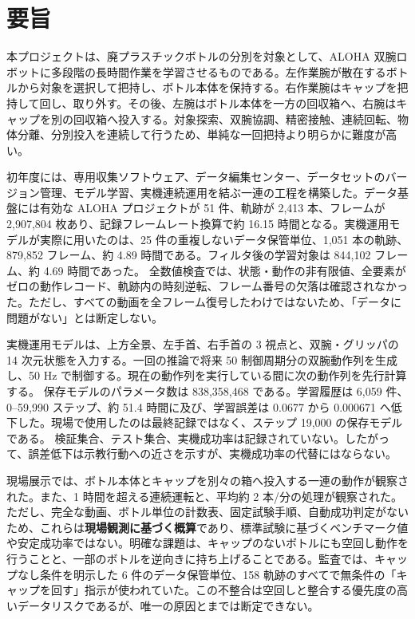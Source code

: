 \chapter*{要旨}

本プロジェクトは、廃プラスチックボトルの分別を対象として、ALOHA 双腕ロボットに多段階の長時間作業を学習させるものである。左作業腕が散在するボトルから対象を選択して把持し、ボトル本体を保持する。右作業腕はキャップを把持して回し、取り外す。その後、左腕はボトル本体を一方の回収箱へ、右腕はキャップを別の回収箱へ投入する。対象探索、双腕協調、精密接触、連続回転、物体分離、分別投入を連続して行うため、単純な一回把持より明らかに難度が高い。

初年度には、専用収集ソフトウェア、データ編集センター、データセットのバージョン管理、モデル学習、実機連続運用を結ぶ一連の工程を構築した。データ基盤には有効な ALOHA プロジェクトが 51 件、軌跡が 2,413 本、フレームが 2,907,804 枚あり、記録フレームレート換算で約 16.15 時間となる。実機運用モデルが実際に用いたのは、25 件の重複しないデータ保管単位、1,051 本の軌跡、879,852 フレーム、約 4.89 時間である。フィルタ後の学習対象は 844,102 フレーム、約 4.69 時間であった。 全数値検査では、状態・動作の非有限値、全要素がゼロの動作レコード、軌跡内の時刻逆転、フレーム番号の欠落は確認されなかった。ただし、すべての動画を全フレーム復号したわけではないため、「データに問題がない」とは断定しない。

実機運用モデルは、上方全景、左手首、右手首の 3 視点と、双腕・グリッパの 14 次元状態を入力する。一回の推論で将来 50 制御周期分の双腕動作列を生成し、50 Hz で制御する。現在の動作列を実行している間に次の動作列を先行計算する。 保存モデルのパラメータ数は 838,358,468 である。学習履歴は 6,059 件、0--59,990 ステップ、約 51.4 時間に及び、学習誤差は 0.0677 から 0.000671 へ低下した。現場で使用したのは最終記録ではなく、ステップ 19,000 の保存モデルである。 検証集合、テスト集合、実機成功率は記録されていない。したがって、誤差低下は示教行動への近さを示すが、実機成功率の代替にはならない。

現場展示では、ボトル本体とキャップを別々の箱へ投入する一連の動作が観察された。また、1 時間を超える連続運転と、平均約 2 本/分の処理が観察された。 ただし、完全な動画、ボトル単位の計数表、固定試験手順、自動成功判定がないため、これらは\textbf{現場観測に基づく概算}であり、標準試験に基づくベンチマーク値や安定成功率ではない。明確な課題は、キャップのないボトルにも空回し動作を行うことと、一部のボトルを逆向きに持ち上げることである。監査では、キャップなし条件を明示した 6 件のデータ保管単位、158 軌跡のすべてで無条件の「キャップを回す」指示が使われていた。この不整合は空回しと整合する優先度の高いデータリスクであるが、唯一の原因とまでは断定できない。

